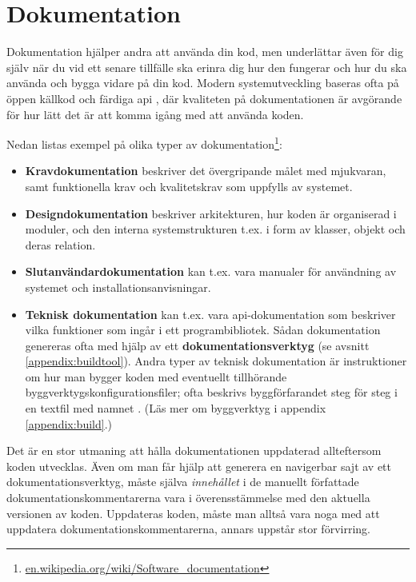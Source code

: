 
\chapter{Dokumentation}\label{appendix:doc}

Dokumentation hjälper andra att använda din kod, men underlättar även för dig själv när du vid ett senare tillfälle ska erinra dig hur den fungerar och hur du ska använda och bygga vidare på din kod. Modern systemutveckling baseras ofta på öppen källkod och färdiga api , där kvaliteten på dokumentationen är avgörande för hur lätt det är att komma igång med att använda koden.

Nedan listas exempel på olika typer av  dokumentation\footnote{\href{https://en.wikipedia.org/wiki/Software_documentation}{en.wikipedia.org/wiki/Software\_documentation}}:

\begin{itemize}
\item \textbf{Kravdokumentation} beskriver det övergripande målet med mjukvaran, samt funktionella krav och kvalitetskrav som uppfylls av systemet.
\item \textbf{Designdokumentation} beskriver arkitekturen, hur koden är organiserad i moduler, och den interna systemstrukturen t.ex. i form av klasser, objekt och deras relation.
\item \textbf{Slutanvändardokumentation} kan t.ex. vara manualer för användning av systemet och installationsanvisningar.
\item \textbf{Teknisk dokumentation} kan t.ex. vara api-dokumentation som beskriver vilka funktioner som ingår i ett programbibliotek. Sådan dokumentation genereras ofta med hjälp av ett \textbf{dokumentationsverktyg} (se avsnitt \ref{appendix:buildtool}).  Andra typer av teknisk dokumentation är instruktioner om hur man bygger koden med eventuellt tillhörande byggverktygskonfigurationsfiler; ofta beskrivs byggförfarandet steg för steg i en textfil med namnet . (Läs mer om byggverktyg i appendix \ref{appendix:build}.) 
\end{itemize}

\noindent Det är en stor utmaning att hålla dokumentationen uppdaterad allteftersom koden utvecklas. Även om man får hjälp att generera en navigerbar sajt av ett dokumentationsverktyg, måste själva \textit{innehållet} i de manuellt författade dokumentationskommentarerna vara i överensstämmelse med den aktuella versionen av koden. Uppdateras koden, måste man alltså vara noga med att uppdatera dokumentationskommentarerna, annars uppstår stor förvirring. 

